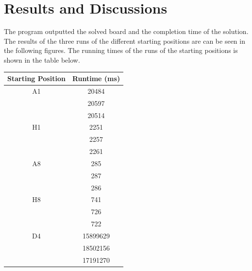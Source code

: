 \section{Results and Discussions}

	The program outputted the solved board and the completion time of the solution.  The results of the three runs of the different starting positions are can be seen in the following figures.  The running times of the runs of the starting positions is shown in the table below.\\
	
\begin{center}
\begin{tabular}{ |c|c| } 
\hline
Starting Position & Runtime (ms) \\
\hline
\multirow{1}{3em}{A1}
& 20484 \\
\hline
\multirow{1}{3em}{}
& 20597 \\
\hline
\multirow{1}{3em}{}
& 20514 \\
\hline
\multirow{1}{3em}{H1}
& 2251 \\
\hline
\multirow{1}{3em}{}
& 2257 \\
\hline
\multirow{1}{3em}{}
& 2261 \\
\hline
\multirow{1}{3em}{A8}
& 285 \\
\hline
\multirow{1}{3em}{}
& 287 \\
\hline
\multirow{1}{3em}{}
& 286 \\
\hline
\multirow{1}{3em}{H8}
& 741 \\
\hline
\multirow{1}{3em}{}
&  726\\
\hline
\multirow{1}{3em}{}
& 722 \\
\hline
\multirow{1}{3em}{D4}
& 15899629 \\
\hline
\multirow{1}{3em}{}
& 18502156 \\
\hline
\multirow{1}{3em}{}
& 17191270 \\
\hline
\end{tabular}
\end{center}

